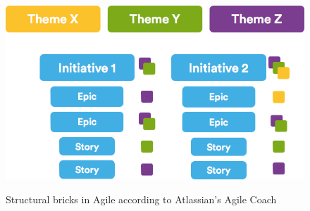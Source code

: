	\begin{figure}[H]
		\centering
		\includegraphics[width=.8\textwidth]{resources/Themes}\\
		\caption{Structural bricks in Agile according to Atlassian's Agile Coach}
	\end{figure}

